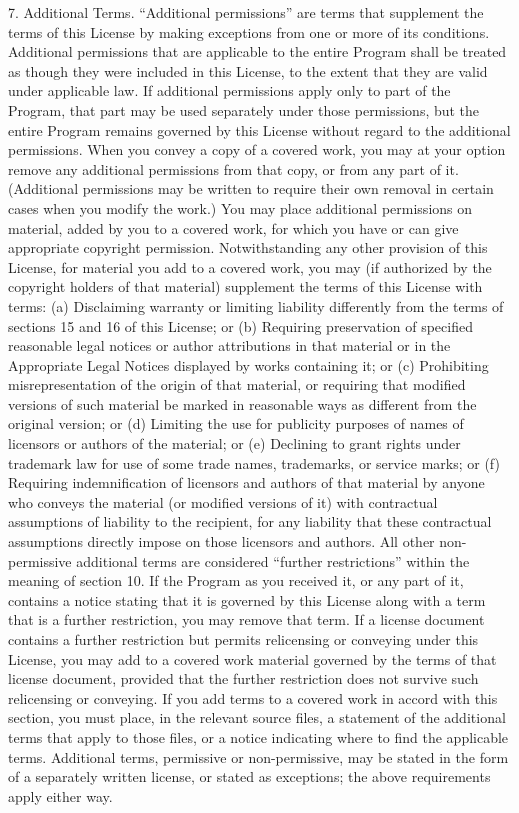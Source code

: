 \documentclass {scrbook}
\begin{document}
\begin{tiny}
7. Additional Terms. ``Additional permissions'' are terms that supplement the terms of this License by making exceptions from one or more of its conditions. Additional permissions that are applicable to the entire Program shall be treated as though they were included in this License, to the extent that they are valid under applicable law. If additional permissions apply only to part of the Program, that part may be used separately under those permissions, but the entire Program remains governed by this License without regard to the additional permissions. When you convey a copy of a covered work, you may at your option remove any additional permissions from that copy, or from any part of it. (Additional permissions may be written to require their own removal in certain cases when you modify the work.) You may place additional permissions on material, added by you to a covered work, for which you have or can give appropriate copyright permission. Notwithstanding any other provision of this License, for material you add to a covered work, you may (if authorized by the copyright holders of that material) supplement the terms of this License with terms: (a) Disclaiming warranty or limiting liability differently from the terms of sections 15 and 16 of this License; or (b) Requiring preservation of specified reasonable legal notices or author attributions in that material or in the Appropriate Legal Notices displayed by works containing it; or (c) Prohibiting misrepresentation of the origin of that material, or requiring that modified versions of such material be marked in reasonable ways as different from the original version; or (d) Limiting the use for publicity purposes of names of licensors or authors of the material; or (e) Declining to grant rights under trademark law for use of some trade names, trademarks, or service marks; or (f) Requiring indemnification of licensors and authors of that material by anyone who conveys the material (or modified versions of it) with contractual assumptions of liability to the recipient, for any liability that these contractual assumptions directly impose on those licensors and authors. All other non-permissive additional terms are considered ``further restrictions'' within the meaning of section 10. If the Program as you received it, or any part of it, contains a notice stating that it is governed by this License along with a term that is a further restriction, you may remove that term. If a license document contains a further restriction but permits relicensing or conveying under this License, you may add to a covered work material governed by the terms of that license document, provided that the further restriction does not survive such relicensing or conveying. If you add terms to a covered work in accord with this section, you must place, in the relevant source files, a statement of the additional terms that apply to those files, or a notice indicating where to find the applicable terms. Additional terms, permissive or non-permissive, may be stated in the form of a separately written license, or stated as exceptions; the above requirements apply either way.


\end{tiny}
\end{document}
